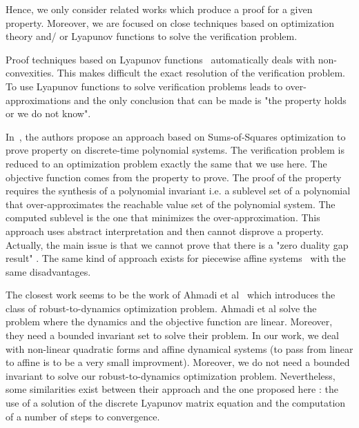 \documentclass[10pt]{article}
\begin{document}
Hence, we only consider related works which produce a proof for a given property. Moreover, we are focused on close techniques based on optimization theory and/ or Lyapunov functions to solve the verification problem. 

Proof techniques based on Lyapunov functions~\cite{roozbehani2013optimization,blanchini2009lyapunov} automatically deals with non-convexities. This makes difficult the exact resolution of the verification problem. To use Lyapunov functions to solve verification problems leads  to over-approximations and the only conclusion that can be made is "the property holds or we do not know".

In~\cite{adje2015property}, the authors propose  an approach based on Sums-of-Squares optimization to prove property on discrete-time polynomial systems. The verification problem is reduced to an optimization problem exactly the same that we use here.  The objective function comes from the property to prove. The proof of the property requires the synthesis of a polynomial invariant i.e.  a sublevel set of a polynomial that over-approximates the reachable value set of the polynomial system. The computed sublevel is the one that minimizes the over-approximation. This approach uses abstract interpretation and then cannot disprove a property. Actually, the main issue is that we cannot prove that there is a "zero duality gap result" . The same kind of approach exists for piecewise affine systems~\cite{10.1007/978-3-319-54292-8_2} with the same disadvantages. 

The closest work seems to be the work of Ahmadi et al~\cite{7403149,ahmadi2018robust} which introduces the class of robust-to-dynamics optimization problem. Ahmadi et al solve the problem where the dynamics and the objective function are linear. Moreover, they need a bounded invariant set to solve their problem. In our work, we deal with non-linear quadratic  forms and affine dynamical systems (to pass from linear to affine is to be a very small improvment).  Moreover, we do not need a bounded invariant to solve our robust-to-dynamics optimization problem.  Nevertheless, some similarities exist between their approach and the one proposed here : the use of a solution of the discrete Lyapunov matrix equation and the computation of a number of steps to convergence.  

\end{document}
